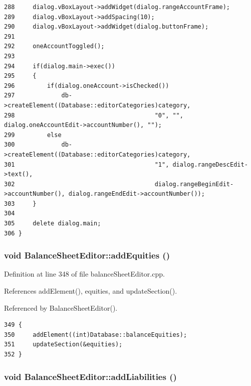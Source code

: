 \begin{verbatim}
288     dialog.vBoxLayout->addWidget(dialog.rangeAccountFrame);
289     dialog.vBoxLayout->addSpacing(10);
290     dialog.vBoxLayout->addWidget(dialog.buttonFrame);
291     
292     oneAccountToggled();
293     
294     if(dialog.main->exec())
295     {
296         if(dialog.oneAccount->isChecked())
297             db->createElement((Database::editorCategories)category,
298                                       "0", "", dialog.oneAccountEdit->accountNumber(), "");
299         else
300             db->createElement((Database::editorCategories)category,
301                                       "1", dialog.rangeDescEdit->text(),
302                                       dialog.rangeBeginEdit->accountNumber(), dialog.rangeEndEdit->accountNumber());
303     }
304     
305     delete dialog.main;
306 }
\end{verbatim}\normalsize 


\hypertarget{classBalanceSheetEditor_k4}{
\subsubsection[addEquities]{\setlength{\rightskip}{0pt plus 5cm}void Balance\-Sheet\-Editor::add\-Equities ()}}
\label{classBalanceSheetEditor_k4}


Definition at line 348 of file balance\-Sheet\-Editor.cpp.

References add\-Element(), equities, and update\-Section().

Referenced by Balance\-Sheet\-Editor().

\footnotesize\begin{verbatim}349 {
350     addElement((int)Database::balanceEquities);
351     updateSection(&equities);
352 }
\end{verbatim}\normalsize 


\hypertarget{classBalanceSheetEditor_k3}{
\subsubsection[addLiabilities]{\setlength{\rightskip}{0pt plus 5cm}void Balance\-Sheet\-Editor::add\-Liabilities ()}}
\label{classBalanceSheetEditor_k3}


